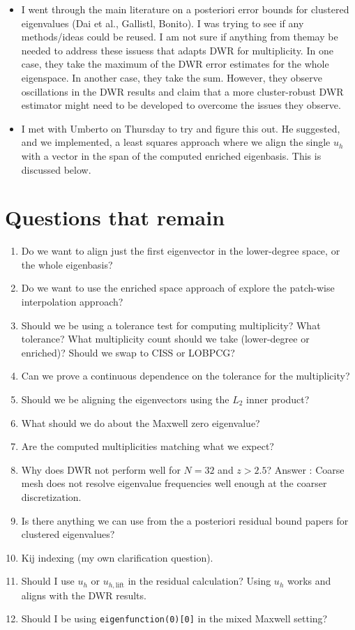 \documentclass[12pt,a4paper]{article}
\begin{document}
\begin{itemize}
    \item I went through the main literature on a posteriori error bounds for clustered eigenvalues (Dai et al., Gallistl, Bonito). I was trying to see if any methods/ideas could be reused. I am not sure if anything from themay be needed to address these issuess that adapts DWR for multiplicity. In one case, they take the maximum of the DWR error estimates for the whole eigenspace. In another case, they take the sum. However, they observe oscillations in the DWR results and claim that a more cluster-robust DWR estimator might need to be developed to overcome the issues they observe.
    \item I met with Umberto on Thursday to try and figure this out. He suggested, and we implemented, a least squares approach where we align the single $u_h$ with a vector in the span of the computed enriched eigenbasis. This is discussed below. 
\end{itemize}

\section{Questions that remain}

\begin{enumerate}
    \item Do we want to align just the first eigenvector in the lower-degree space, or the whole eigenbasis?
    \item Do we want to use the enriched space approach of explore the patch-wise interpolation approach?
    \item Should we be using a tolerance test for computing multiplicity? What tolerance? What multiplicity count should we take (lower-degree or enriched)? Should we swap to CISS or LOBPCG? 
    \item Can we prove a continuous dependence on the tolerance for the multiplicity? 
    \item Should we be aligning the eigenvectors using the $L_2$ inner product? 
    \item What should we do about the Maxwell zero eigenvalue? 
    \item Are the computed multiplicities matching what we expect?
    \item Why does DWR not perform well for $N=32$ and $z>2.5$? Answer : Coarse mesh does not resolve eigenvalue frequencies well enough at the coarser discretization.
    \item Is there anything we can use from the a posteriori residual bound papers for clustered eigenvalues?
     \item Kij indexing (my own clarification question).
    \item Should I use $u_h$ or $u_{h, \text{lift}}$ in the residual calculation? Using $u_h$ works and aligns with the DWR results. 
    \item Should I be using \texttt{eigenfunction(0)[0]} in the mixed Maxwell setting?
\end{enumerate}
\end{document}
